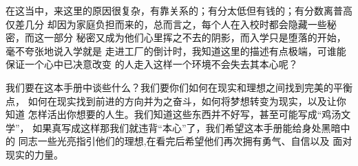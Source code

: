 \documentclass{article}
\begin{document}
在这当中，来这里的原因很复杂，有靠关系的；有分太低但有钱的；有分数离普高仅差几分
却因为家庭负担而来的，总而言之，每个人在入校时都会隐藏一些秘密，而这一部分
秘密又成为他们心里挥之不去的阴影，而入学只是堕落的开始，毫不夸张地说入学就是
走进工厂的倒计时，我知道这里的描述有点极端，可谁能保证一个心中已决意改变
的人走入这样一个环境不会失去其本心呢？

我们要在这本手册中谈些什么？我们要你们如何在现实和理想之间找到完美的平衡点，
如何在现实找到前进的方向并为之奋斗，如何将梦想转变为现实，以及让你知道
怎样活出你想要的人生。我们知道这些东西并不好写，甚至可能写成“鸡汤文学”，
如果真写成这样那我们就违背“本心”了，我们希望这本手册能给身处黑暗中的
同志一些光亮指引他们的理想,在看完后希望他们再次拥有勇气、自信以及
面对现实的力量。

\newpage
\tableofcontents


\end{document}
